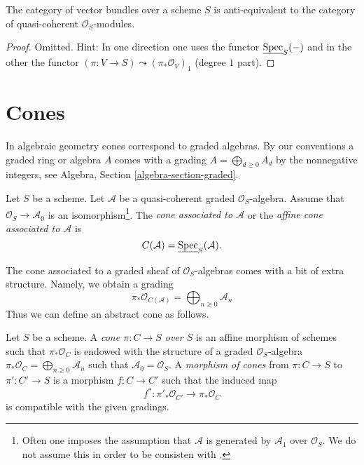 \begin{lemma}
\label{lemma-category-vector-bundles}
The category of vector bundles over a scheme $S$ is
anti-equivalent to the category of quasi-coherent $\mathcal{O}_S$-modules.
\end{lemma}

\begin{proof}
Omitted. Hint: In one direction one uses the functor
$\underline{\mathop{\rm Spec}}_S(-)$ and in the other the functor
$(\pi : V \to S) \leadsto (\pi_*\mathcal{O}_V)_1$ (degree $1$ part).
\end{proof}




\section{Cones}
\label{section-cone}

\noindent
In algebraic geometry cones correspond to graded algebras. By our conventions
a graded ring or algebra $A$ comes with a grading
$A = \bigoplus_{d \geq 0} A_d$ by the nonnegative integers, see
Algebra, Section \ref{algebra-section-graded}.

\begin{definition}
\label{definition-cone}
Let $S$ be a scheme. Let $\mathcal{A}$ be a quasi-coherent
graded $\mathcal{O}_S$-algebra. Assume that $\mathcal{O}_S \to \mathcal{A}_0$
is an isomorphism\footnote{Often one imposes the assumption that
$\mathcal{A}$ is generated by $\mathcal{A}_1$ over $\mathcal{O}_S$. We do not
assume this in order to be consisten with \cite[II, (8.3.1)]{EGA}.}.
The {\it cone associated to $\mathcal{A}$} or the
{\it affine cone associated to $\mathcal{A}$}
is
$$
C(\mathcal{A}) = \underline{\mathop{\rm Spec}}_S(\mathcal{A}).
$$
\end{definition}

\noindent
The cone associated to a graded sheaf of $\mathcal{O}_S$-algebras
comes with a bit of extra structure. Namely, we obtain a grading
$$
\pi_*\mathcal{O}_{C(\mathcal{A})} =
\bigoplus\nolimits_{n \geq 0} \mathcal{A}_n
$$
Thus we can define an abstract cone as follows.

\begin{definition}
\label{definition-abstract-cone}
Let $S$ be a scheme. A {\it cone $\pi : C \to S$ over $S$} is an
affine morphism of schemes such that $\pi_*\mathcal{O}_C$ is endowed with
the structure of a graded $\mathcal{O}_S$-algebra
$\pi_*\mathcal{O}_C = \bigoplus\nolimits_{n \geq 0} \mathcal{A}_n$
such that $\mathcal{A}_0 = \mathcal{O}_S$. A {\it morphism of cones}
from $\pi : C \to S$ to $\pi' : C' \to S$
is a morphism $f : C \to C'$ such that the induced map
$$
f^* : \pi'_*\mathcal{O}_{C'} \longrightarrow \pi_*\mathcal{O}_C
$$
is compatible with the given gradings.
\end{definition}

